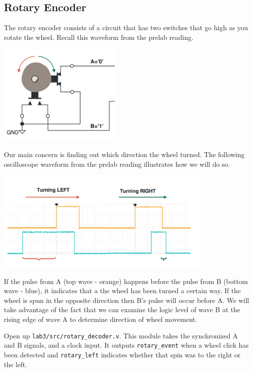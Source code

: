 \documentclass[11pt]{article}
\begin{document}
\subsection{Rotary Encoder}

The rotary encoder consists of a circuit that has two switches that go high as you rotate the wheel. Recall this waveform from the prelab reading.

\begin{center}
\includegraphics[height=5cm]{images/lab2_fig5.png}
\end{center}

Our main concern is finding out which direction the wheel turned. The following oscilloscope waveform from the prelab reading illustrates how we will do so. 

\begin{center}
	\includegraphics[height=5cm]{images/lab2_fig6.png}
\end{center}

If the pulse from A (top wave - orange) happens before the pulse from B (bottom wave - blue), it indicates that a the wheel has been turned a certain way. If the wheel is spun in the opposite direction then B's pulse will occur before A. We will take advantage of the fact that we can examine the logic level of wave B at the rising edge of wave A to determine direction of wheel movement.

Open up \verb|lab3/src/rotary_decoder.v|. This module takes the synchronized A and B signals, and a clock input. It outputs \verb|rotary_event| when a wheel click has been detected and \verb|rotary_left| indicates whether that spin was to the right or the left.\\
\end{document}
